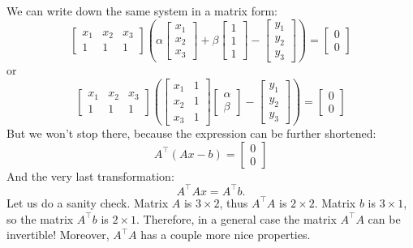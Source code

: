 \documentclass[notitlepage,oneside]{book}
\begin{document}
We can write down the same system in a matrix form:
$$
\begin{bmatrix}x_1 & x_2 & x_3 \\ 1 & 1 & 1 \end{bmatrix}
\left(\alpha \begin{bmatrix}x_1  \\ x_2 \\x_3  \end{bmatrix}
+\beta \begin{bmatrix}1 \\ 1 \\1 \end{bmatrix} - 
\begin{bmatrix}y_1\\y_2\\y_3\end{bmatrix}\right) = \begin{bmatrix}0\\0\end{bmatrix}
$$
or
$$
\begin{bmatrix}x_1 & x_2 & x_3 \\ 1 & 1 & 1 \end{bmatrix}
\left(
\begin{bmatrix}x_1  & 1 \\ x_2 & 1 \\x_3 & 1 \end{bmatrix}
\begin{bmatrix} \alpha \\ \beta \end{bmatrix}-
\begin{bmatrix} y_1 \\ y_2 \\ y_3 \end{bmatrix}
\right) = \begin{bmatrix}0\\0\end{bmatrix}
$$
But we won't stop there, because the expression can be further shortened:
$$
A^\top (Ax - b)= \begin{bmatrix}0\\0\end{bmatrix}
$$
And the very last transformation:
$$
A^\top Ax = A^\top b.
$$
Let us do a sanity check. Matrix $A$ is $3\times 2$, thus  $A^\top A$ is $2\times 2$. Matrix $b$ is $3\times 1$, so the matrix $A^\top b$ is $2\times 1$.
Therefore, in a general case the matrix $A^\top A$ can be invertible! Moreover, $A^\top A$ has a couple more nice properties.
\end{document}
